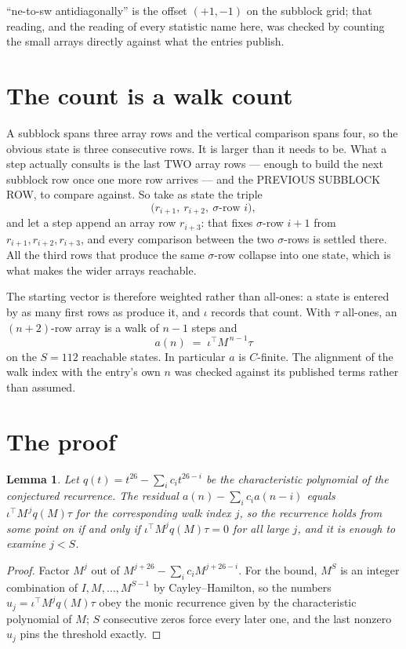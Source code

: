 \documentclass[11pt,a4paper]{article}
\theoremstyle{plain}
\newtheorem{lemma}[theorem]{Lemma}
\theoremstyle{definition}
\begin{document}
``ne-to-sw antidiagonally'' is the offset $(+1,-1)$ on the subblock grid; that reading, and
the reading of every statistic name here, was checked by counting the small arrays directly
against what the entries publish.

\section{The count is a walk count}

A subblock spans three array rows and the vertical comparison spans four, so the obvious state
is three consecutive rows. It is larger than it needs to be. What a step actually consults is
the last TWO array rows --- enough to build the next subblock row once one more row arrives ---
and the PREVIOUS SUBBLOCK ROW, to compare against. So take as state the triple
\[
\bigl(r_{i+1},\ r_{i+2},\ \sigma\text{-row }i\bigr),
\]
and let a step append an array row $r_{i+3}$: that fixes $\sigma$-row $i+1$ from
$r_{i+1},r_{i+2},r_{i+3}$, and every comparison between the two $\sigma$-rows is settled
there. All the third rows that produce the same $\sigma$-row collapse into one state, which is
what makes the wider arrays reachable.

The starting vector is therefore weighted rather than all-ones: a state is entered by as many
first rows as produce it, and $\iota$ records that count. With $\tau$ all-ones, an
$(n+2)$-row array is a walk of $n-1$ steps and
\[
a(n)\;=\;\iota^{\!\top}M^{\,n-1}\tau
\]
on the $S=112$ reachable states. In particular $a$ is $C$-finite. The alignment of the walk
index with the entry's own $n$ was checked against its published terms rather than assumed.

\section{The proof}

\begin{lemma}\label{lem:crit}
Let $q(t)=t^{26}-\sum_i c_it^{26-i}$ be the characteristic polynomial of the
conjectured recurrence. The residual $a(n)-\sum_ic_ia(n-i)$ equals
$\iota^{\!\top}M^{\,j}q(M)\tau$ for the corresponding walk index $j$, so the recurrence
holds from some point on if and only if $\iota^{\!\top}M^{j}q(M)\tau=0$ for all large $j$,
and it is enough to examine $j<S$.
\end{lemma}

\begin{proof}
Factor $M^{j}$ out of $M^{j+26}-\sum_ic_iM^{j+26-i}$. For the bound, $M^{S}$
is an integer combination of $I,M,\dots,M^{S-1}$ by Cayley--Hamilton, so the numbers
$u_j=\iota^{\!\top}M^{j}q(M)\tau$ obey the monic recurrence given by the characteristic
polynomial of $M$; $S$ consecutive zeros force every later one, and the last nonzero $u_j$
pins the threshold exactly.
\end{proof}
\end{document}
